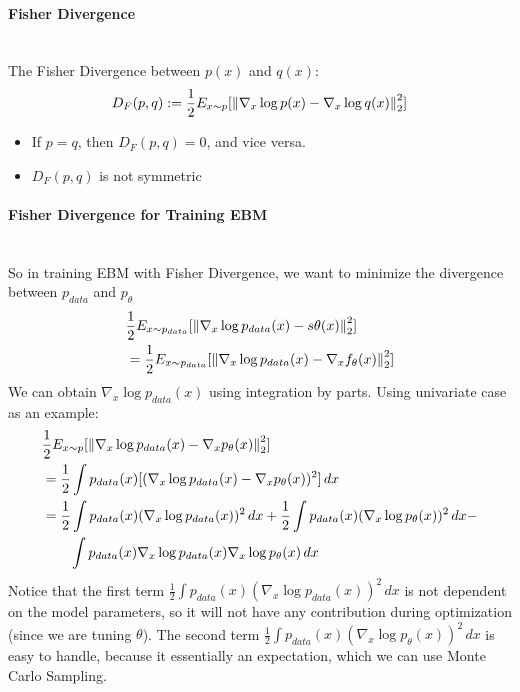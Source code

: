 \paragraph{Fisher Divergence}\mbox{}\\
The Fisher Divergence between $p(x)$ and $q(x)$: 
    \begin{align*}
        D_F(p,q) := \frac{1}{2} E_{x\sim p}[\left\lVert\nabla_x \log p(x) - \nabla_x \log q(x)\right\rVert_2^2]
    \end{align*}
    \begin{itemize}
        \item If $p=q$, then $D_F(p,q)=0$, and vice versa. 
        \item $D_F(p,q)$ is not symmetric
    \end{itemize}
    
\paragraph{Fisher Divergence for Training EBM}\mbox{}\\
So in training EBM with Fisher Divergence, we want to minimize the divergence between $p_{data}$ and $p_{\theta}$
    \begin{align*}
        & \frac{1}{2} E_{x\sim p_{data}}[\left\lVert\nabla_x \log p_{data}(x) - s\theta(x)\right\rVert_2^2]\\
        & = \frac{1}{2} E_{x\sim p_{data}}[\left\lVert\nabla_x \log p_{data}(x) - \nabla_x f_\theta(x)\right\rVert_2^2]\\
    \end{align*}
We can obtain $\nabla_x \log p_{data}(x)$ using integration by parts. Using univariate case as an example: 
    \begin{align*}
        & \frac{1}{2} E_{x\sim p}[\left\lVert\nabla_x \log p_{data}(x) - \nabla_x p_\theta(x)\right\rVert_2^2]\\
        & = \frac{1}{2} \int p_{data}(x) [(\nabla_x \log p_{data}(x) - \nabla_x p_\theta(x))^2] \, dx\\
        & = \frac{1}{2} \int p_{data}(x) (\nabla_x \log p_{data}(x))^2 \, dx + \frac{1}{2} \int p_{data}(x) (\nabla_x \log p_\theta(x))^2 \, dx -  \\
        &\qquad \int p_{data}(x)\nabla_x \log p_{data}(x) \nabla_x \log p_\theta(x) \,dx
    \end{align*}
Notice that the first term $\frac{1}{2} \int p_{data}(x) (\nabla_x \log p_{data}(x))^2 \, dx$ is not dependent on the model parameters, so it will not have any contribution during optimization (since we are tuning $\theta$). The second term $ \frac{1}{2} \int p_{data}(x) (\nabla_x \log p_\theta(x))^2 \, dx$ is easy to handle, because it essentially an expectation, which we can use Monte Carlo Sampling. \\

